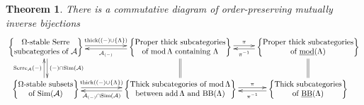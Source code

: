 \documentclass{amsart}
\newtheorem{thm}{Theorem}[section]
\theoremstyle{definition}
\theoremstyle{remark}
\numberwithin{equation}{thm}
\def\A{\mathcal{A}}
\def\add{\operatorname{add}}
\def\BB{\operatorname{BB}}
\def\L{\Lambda}
\def\mod{\operatorname{mod}}
\def\Serre{\operatorname{Serre}}
\def\thick{\operatorname{thick}}
\begin{document}
\begin{thm}\label{classification equal two}
There is a commutative diagram of order-preserving mutually inverse bijections
$$
\xymatrix@C=1.7pc{
{\left\{
\begin{matrix}
\text{$\Omega$-stable Serre}\\
\text{subcategories of $\A$}
\end{matrix}
\right\}}
\ar@<.7mm>[rr]^-{\thick((-)\cup\{\L\})}
\ar@<.7mm>[d]^-{(-)\cap\operatorname{Sim}(\A)}
&&
{\left\{
\begin{matrix}
\text{Proper thick subcategories}\\
\text{of $\mod\L$ containing $\L$}
\end{matrix}
\right\}}
\ar@<.7mm>[ll]^-{\A_{(-)}}
\ar@<.7mm>[r]^-{\pi}
\ar@{=}[d]
&
{\left\{
\begin{matrix}
\text{Proper thick subcategories}\\
\text{of $\underline{\mod}(\L)$}
\end{matrix}
\right\}}
\ar@<.7mm>[l]^-{\pi^{-1}}
\ar@{=}[d]\\
{\left\{
\begin{matrix}
\text{$\Omega$-stable subsets}\\
\text{of $\operatorname{Sim}(\A)$}
\end{matrix}
\right\}}
\ar@<.7mm>[rr]^-{\thick((-)\cup\{\L\})}
\ar@<.7mm>[u]^-{\Serre_{\A}(-)}
&&
{\left\{
\begin{matrix}
\text{Thick subcategories of $\mod\L$}\\
\text{between $\add\L$ and $\BB(\L)$}
\end{matrix}
\right\}}
\ar@<.7mm>[ll]^-{\A_{(-)}\cap\operatorname{Sim}(\A)}
\ar@<.7mm>[r]^-{\pi}
&
{\left\{
\begin{matrix}
\text{Thick subcategories}\\
\text{of $\underline{\BB}(\L)$}
\end{matrix}
\right\}}
\ar@<.7mm>[l]^-{\pi^{-1}}
}
$$
\end{thm}
\end{document}
